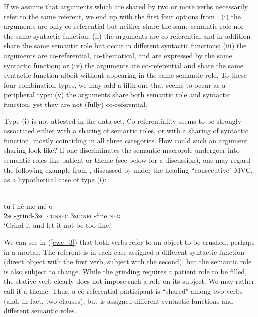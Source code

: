 If we assume that arguments which are shared by two or more verbs necessarily refer to the same referent, we end up with the first four options from : (i) the arguments are only co-referential but neither share the same semantic role nor the same syntactic function; (ii) the arguments are co-referential and in addition share the same semantic role but occur in different syntactic functions; (iii) the arguments are co-referential, co-thematical, and are expressed by the same syntactic function; or (iv) the arguments are co-referential and share the same syntactic function albeit without appearing in the same semantic role. To these four combination types, we may add a fifth one that seems to occur as a peripheral type: (v) the arguments share both semantic role and syntactic function, yet they are not (fully) co-referential.

Type (i) is not attested in the data set. Co-referentiality seems to be strongly associated either with a sharing of semantic roles, or with a sharing of syntactic function, mostly coinciding in all three categories. How could such an argument sharing look like? If one discriminates the semantic macrorole undergoer into semantic roles like patient or theme (see below for a discussion), one may regard the following example from , discussed by \citet{ameka2005multiverb} under the heading ``consecutive" MVC, as a hypothetical case of type (i):

\ea \label{ewe_3}
\\
\gll tu-i né me-mé o \\
2\textsc{sg}-grind-3\textsc{sg} \textsc{consec} 3\textsc{sg}:\textsc{neg}-fine \textsc{neg} \\
\glft `Grind it and let it not be too fine.'\\ 
\z

We can see in (\ref{ewe_3}) that both verbs refer to an object to be crushed, perhaps in a mortar. The referent is in each case assigned a different syntactic function (direct object with the first verb, subject with the second), but the semantic role is also subject to change. While the grinding requires a patient role to be filled, the stative verb clearly does not impose such a role on its subject. We may rather call it a theme. Thus, a co-referential participant is ``shared" among two verbs (and, in fact, two clauses), but is assigned different syntactic functions and different semantic roles.

